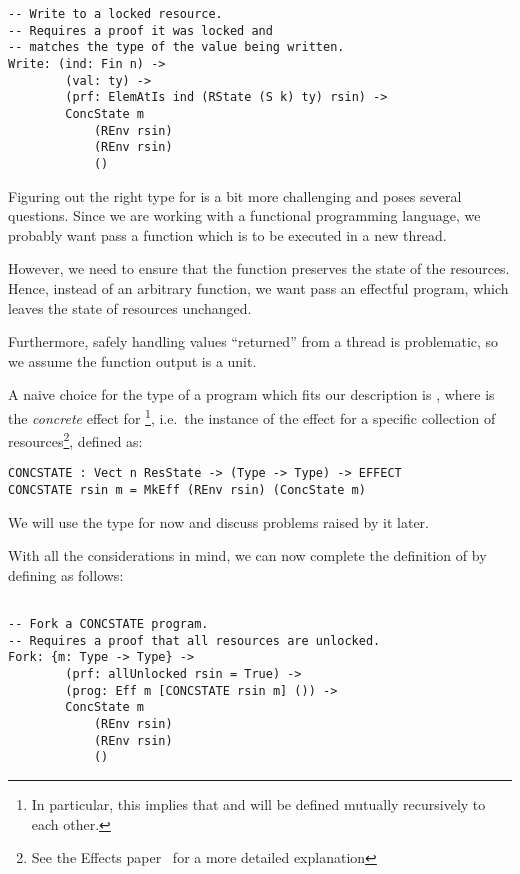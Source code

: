 \begin{BVerbatim}
-- Write to a locked resource.
-- Requires a proof it was locked and
-- matches the type of the value being written.
Write: (ind: Fin n) ->
        (val: ty) ->
        (prf: ElemAtIs ind (RState (S k) ty) rsin) ->
        ConcState m
            (REnv rsin)
            (REnv rsin)
            ()

\end{BVerbatim}

Figuring out the right type for  is a bit more challenging and
poses several questions. Since we are working with a functional programming
language, we probably want pass a function which is to be executed in a new
thread.

However, we need to ensure that the function preserves the state of
the resources. Hence, instead of an arbitrary function, we want pass an
effectful program, which leaves the state of resources unchanged.

Furthermore, safely handling values ``returned'' from a thread is problematic, so
we assume the function output is a unit.

A naive choice for the type of a program which fits our description is
, where  is the
\emph{concrete} effect for {\footnote{In
particular, this implies that  and  will be
defined mutually recursively to each other.}}, i.e.~the
instance of the effect for a specific collection of resources\footnote{See the
Effects paper~\cite[p.~2]{effects-idr} for a more detailed explanation},
defined as:

\begin{BVerbatim}
CONCSTATE : Vect n ResState -> (Type -> Type) -> EFFECT
CONCSTATE rsin m = MkEff (REnv rsin) (ConcState m)
\end{BVerbatim}

We will use the type  for now and discuss
problems raised by it later.

With all the considerations in mind, we can now complete the definition of
 by defining  as follows:

\begin{BVerbatim}

-- Fork a CONCSTATE program.
-- Requires a proof that all resources are unlocked.
Fork: {m: Type -> Type} ->
        (prf: allUnlocked rsin = True) ->
        (prog: Eff m [CONCSTATE rsin m] ()) ->
        ConcState m
            (REnv rsin)
            (REnv rsin)
            ()

\end{BVerbatim}

